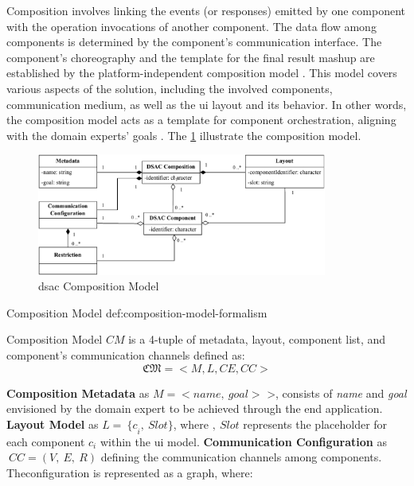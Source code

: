 Composition involves linking the events (or responses) emitted by one
component with the operation invocations of another component. The data
flow among components is determined by the component’s communication
interface. The component’s choreography and the template
for the final result mashup are established by the platform-independent
composition model \autocite{Daniel2009d}. This model covers
various aspects of the solution, including the involved components,
communication medium, as well as the \gls{ui} layout and its behavior. In other
words, the composition model acts as a template for component
orchestration, aligning with the domain experts’ goals
\autocite{Pietschmann2010}.
The \cref{fig:composition-model} illustrate the composition model.
\begin{figure}[hbt]
\hypertarget{fig:composition-model}{%
\centering
\includegraphics[width=0.85\textwidth]{../figures/MyFigures/CompositionModel.drawio.pdf}
\captionsetup{justification=centering}
\caption{\gls{dsac} Composition Model}\label{fig:composition-model}
}
\end{figure}

\begin{thesisdefinition}{Composition Model }{def:composition-model-formalism}

Composition Model \(CM\) is a 4-tuple of metadata, layout, component list, and component's communication channels defined as:
\begin{equation}\mathfrak{CM} = <M,L,CE,CC>\label{eq:composition-tuple}\end{equation}
\end{thesisdefinition}

\textbf{Composition Metadata} as 	\(M = < name,\ goal >\) 	>, consists of \emph{name} and \emph{goal} envisioned by the domain expert to be achieved through the end application.
\textbf{Layout Model} as \(L = \ {\{ c}_{i},\ Slot\}\), where \(,\ Slot\) represents the placeholder for each component \(c_{i}\) within the \gls{ui} model.
\textbf{Communication Configuration} as \emph{﻿}\(\ CC = (V,\ E,\ R)\) defining the communication channels among components. Theconfiguration is represented as a graph, where:

